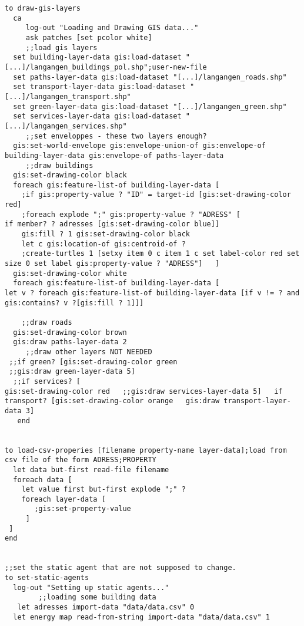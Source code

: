 \documentclass[english]{article}
\begin{document}
\begin{lstlisting}[basicstyle={\scriptsize}]
to draw-gis-layers
  ca
     log-out "Loading and Drawing GIS data..."
     ask patches [set pcolor white]
     ;;load gis layers
  set building-layer-data gis:load-dataset "[...]/langangen_buildings_pol.shp";user-new-file
  set paths-layer-data gis:load-dataset "[...]/langangen_roads.shp"
  set transport-layer-data gis:load-dataset "[...]/langangen_transport.shp"
  set green-layer-data gis:load-dataset "[...]/langangen_green.shp"
  set services-layer-data gis:load-dataset "[...]/langangen_services.shp"
     ;;set enveloppes - these two layers enough?
  gis:set-world-envelope gis:envelope-union-of gis:envelope-of building-layer-data gis:envelope-of paths-layer-data
     ;;draw buildings
  gis:set-drawing-color black
  foreach gis:feature-list-of building-layer-data [
    ;if gis:property-value ? "ID" = target-id [gis:set-drawing-color red]
    ;foreach explode ";" gis:property-value ? "ADRESS" [
if member? ? adresses [gis:set-drawing-color blue]]
    gis:fill ? 1 gis:set-drawing-color black
    let c gis:location-of gis:centroid-of ?
    ;create-turtles 1 [setxy item 0 c item 1 c set label-color red set size 0 set label gis:property-value ? "ADRESS"]   ]
  gis:set-drawing-color white
  foreach gis:feature-list-of building-layer-data [
let v ? foreach gis:feature-list-of building-layer-data [if v != ? and gis:contains? v ?[gis:fill ? 1]]]

    ;;draw roads
  gis:set-drawing-color brown
  gis:draw paths-layer-data 2
     ;;draw other layers NOT NEEDED
 ;;if green? [gis:set-drawing-color green 
 ;;gis:draw green-layer-data 5]
  ;;if services? [
gis:set-drawing-color red   ;;gis:draw services-layer-data 5]   if transport? [gis:set-drawing-color orange   gis:draw transport-layer-data 3]   
   end


to load-csv-properies [filename property-name layer-data];load from csv file of the form ADRESS;PROPERTY
  let data but-first read-file filename
  foreach data [
    let value first but-first explode ";" ?
    foreach layer-data [
       ;gis:set-property-value
     ]
 ]
end


;;set the static agent that are not supposed to change.
to set-static-agents
  log-out "Setting up static agents..."
        ;;loading some building data 
   let adresses import-data "data/data.csv" 0
  let energy map read-from-string import-data "data/data.csv" 1


\end{lstlisting}
\end{document}

